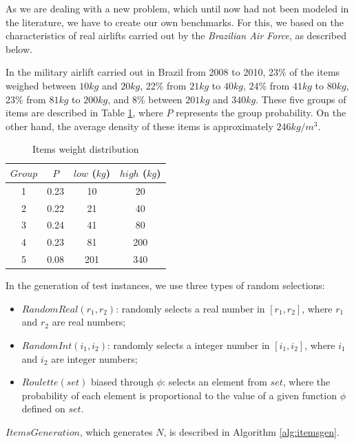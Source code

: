 \documentclass[preprint]{elsarticle}
\begin{document}
As we are dealing with a new problem, which until now had not been modeled in the literature, we have to create our own benchmarks. For this, we based on the characteristics of real airlifts carried out by the {\it Brazilian Air Force}, as described below.

In the military airlift carried out in Brazil from 2008 to 2010, 23\% of the items weighed between $10kg$ and $20kg$, 22\% from $21kg$ to $40kg$, 24\% from $41kg$ to $80kg$, 23\% from $81kg$ to $200kg$, and 8\% between $201kg$ and $340kg$. These five groups of items are described in Table \ref{tab:weights}, where $P$\/ represents the group probability. On the other hand, the average density of these items is approximately $246 kg/m^3$.

\begin{table}[H]
	\centering
	\caption{Items weight distribution}  \label{tab:weights}
	\begin{tabular}{c c c c }
		\toprule
		$Group$ & $P$ & $low$ ($kg$) & $high$ ($kg$) \\		
		\midrule
		1              & 0.23           & 10  & 20  \\
		2              & 0.22           & 21  & 40  \\
		3              & 0.24           & 41  & 80  \\		
		4              & 0.23           & 81  & 200 \\
		5              & 0.08           & 201 & 340 \\
		\bottomrule
	\end{tabular}
\end{table}


In the generation of test instances, we use three types of random selections:
\begin{itemize}
	\item $RandomReal(r_1,r_2)$: randomly selects a real number in $[r_1,r_2]$, where $r_1$ and $r_2$ are real numbers;
	\item $RandomInt(i_1,i_2)$: randomly selects a integer number in $[i_1,i_2]$, where $i_1$ and $i_2$ are integer numbers;
	\item $Roulette(set)$ biased through $\phi$: selects an element from $set$, where the probability of each element is proportional to the value of a given function $\phi$\/ defined on $set$.
\end{itemize}

$ItemsGeneration$, which generates $N$, is described in Algorithm \ref{alg:itemsgen}.
\end{document}
